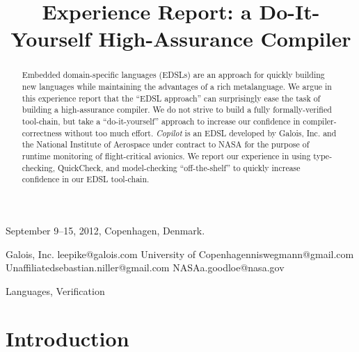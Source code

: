 \documentclass[9pt]{sigplanconf}
\begin{document}
 {September 9--15, 2012, Copenhagen, Denmark.}


\title{Experience Report: a Do-It-Yourself High-Assurance Compiler}

           {Galois, Inc.}
           {leepike@galois.com}
           {University of Copenhagen}{niswegmann@gmail.com}
           {Unaffiliated}{sebastian.niller@gmail.com}
           {NASA}{a.goodloe@nasa.gov}
\maketitle

\begin{abstract}
Embedded domain-specific languages (EDSLs) are an approach for quickly building
new languages while maintaining the advantages of a rich metalanguage.  We argue
in this experience report that the ``EDSL approach'' can surprisingly ease the
task of building a high-assurance compiler.  We do not strive to build a fully
formally-verified tool-chain, but take a ``do-it-yourself'' approach to increase
our confidence in compiler-correctness without too much effort.  \emph{Copilot}
is an EDSL developed by Galois, Inc. and the National Institute of Aerospace
under contract to NASA for the purpose of runtime monitoring of flight-critical
avionics.  We report our experience in using type-checking, QuickCheck, and
model-checking ``off-the-shelf'' to quickly increase confidence in our EDSL
tool-chain.
\end{abstract}


\terms
Languages, Verification






\section{Introduction}\label{sec:intro}
\end{document}
